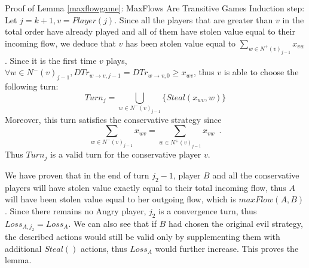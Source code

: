 \begin{sepproof}{Proof of Lemma \ref{maxflowgame}: MaxFlows Are Transitive Games}
  Induction step: Let $j = k + 1, v = Player\left(j\right)$. Since all the players that are greater than $v$ in the
  total order have already played and all of them have stolen value equal to their incoming flow, we deduce that $v$ has
  been stolen value equal to $\sum\limits_{w \in N^{+}\left(v\right)_{j-1}}x_{vw}$. Since it is the first time $v$
  plays, $\forall w \in N^{-}\left(v\right)_{j-1}, DTr_{w \rightarrow v, j-1} = DTr_{w \rightarrow v, 0} \geq x_{wv}$, thus
  $v$ is able to choose the following turn:
  \begin{equation*}
    Turn_j = \bigcup\limits_{w \in N^{-}\left(v\right)_{j-1}}\{Steal\left(x_{wv}, w\right)\}
  \end{equation*}
  Moreover, this turn satisfies the conservative strategy since
  \begin{equation*}
    \sum\limits_{w \in N^{-}\left(v\right)_{j-1}}x_{wv} = \sum\limits_{w \in N^{+}\left(v\right)_{j-1}}x_{vw} \enspace.
  \end{equation*}
  Thus $Turn_j$ is a valid turn for the conservative player $v$.

  We have proven that in the end of turn $j_2 - 1$, player $B$ and all the conservative players will have stolen value
  exactly equal to their total incoming flow, thus $A$ will have been stolen value equal to her outgoing flow, which is
  $maxFlow\left(A, B\right)$. Since there remains no Angry player, $j_2$ is a convergence turn, thus
  $Loss_{A, j_2} = Loss_A$. We can also see that if $B$ had chosen the original evil strategy, the described actions would
  still be valid only by supplementing them with additional $Steal\left(\right)$ actions, thus $Loss_A$ would further
  increase. This proves the lemma.
\end{sepproof}
